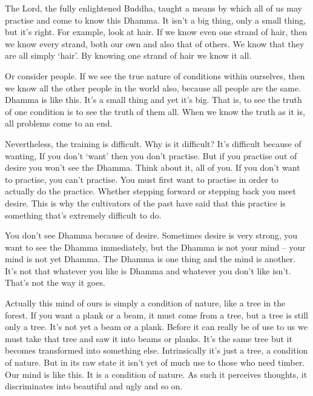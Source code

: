 The Lord, the fully enlightened Buddha, taught a means by which all of us may practise and come to know this Dhamma. It isn't a big thing, only a small thing, but it's right. For example, look at hair. If we know even one strand of hair, then we know every strand, both our own and also that of others. We know that they are all simply `hair'. By knowing one strand of hair we know it all. 

Or consider people. If we see the true nature of conditions within ourselves, then we know all the other people in the world also, because all people are the same. Dhamma is like this. It's a small thing and yet it's big. That is, to see the truth of one condition is to see the truth of them all. When we know the truth as it is, all problems come to an end. 

Nevertheless, the training is difficult. Why is it difficult? It's difficult because of wanting,  If you don't `want' then you don't practise. But if you practise out of desire you won't see the Dhamma. Think about it, all of you. If you don't want to practise, you can't practise. You must first want to practise in order to actually do the practice. Whether stepping forward or stepping back you meet desire. This is why the cultivators of the past have said that this practice is something that's extremely difficult to do. 

You don't see Dhamma because of desire. Sometimes desire is very strong, you want to see the Dhamma immediately, but the Dhamma is not your mind -- your mind is not yet Dhamma. The Dhamma is one thing and the mind is another. It's not that whatever you like is Dhamma and whatever you don't like isn't. That's not the way it goes. 

 Actually this mind of ours is simply a condition of nature, like a tree in the forest. If you want a plank or a beam, it must come from a tree, but a tree is still only a tree. It's not yet a beam or a plank. Before it can really be of use to us we must take that tree and saw it into beams or planks. It's the same tree but it becomes transformed into something else. Intrinsically it's just a tree, a condition of nature. But in its raw state it isn't yet of much use to those who need timber. Our mind is like this. It is a condition of nature. As such it perceives thoughts, it discriminates into beautiful and ugly and so on. 

